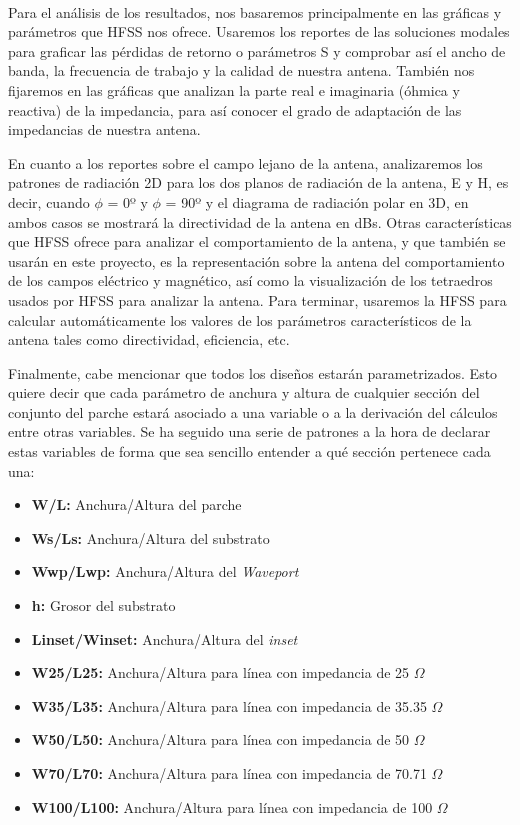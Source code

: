 \\
\par Para el análisis de los resultados, nos basaremos principalmente en las gráficas y parámetros que HFSS nos ofrece. Usaremos los reportes de las soluciones modales para graficar las pérdidas de retorno o parámetros S y comprobar así el ancho de banda, la frecuencia de trabajo y la calidad de nuestra antena. También nos fijaremos en las gráficas que analizan la parte real e imaginaria (óhmica y reactiva) de la impedancia, para así conocer el grado de adaptación de las impedancias de nuestra antena. 
\\
\par En cuanto a los reportes sobre el campo lejano de la antena, analizaremos los patrones de radiación 2D para los dos planos de radiación de la antena, E y H, es decir, cuando $\phi $ = 0º y $\phi $ = 90º y el diagrama de radiación polar en 3D, en ambos casos se mostrará la directividad de la antena en dBs. Otras características que HFSS ofrece para analizar el comportamiento de la antena, y que también se usarán en este proyecto, es la representación sobre la antena del comportamiento de los campos eléctrico y magnético, así como la visualización de los tetraedros usados por HFSS para analizar la antena. Para terminar, usaremos la HFSS para calcular automáticamente los valores de los parámetros característicos de la antena tales como directividad, eficiencia, etc.
\\
\par Finalmente, cabe mencionar que todos los diseños estarán parametrizados. Esto quiere decir que cada parámetro de anchura y altura de cualquier sección del conjunto del parche estará asociado a una variable o a la derivación del cálculos entre otras variables. Se ha seguido una serie de patrones a la hora de declarar estas variables de forma que sea sencillo entender a qué sección pertenece cada una:

\begin{itemize}
\item \textbf{W/L: }Anchura/Altura del parche
\item \textbf{Ws/Ls: }Anchura/Altura del substrato
\item \textbf{Wwp/Lwp: }Anchura/Altura del \textit{Waveport}
\item \textbf{h: }Grosor del substrato
\item \textbf{Linset/Winset: }Anchura/Altura del \textit{inset}
\item \textbf{W25/L25: }Anchura/Altura para línea con impedancia de 25 $\Omega$
\item \textbf{W35/L35: }Anchura/Altura para línea con impedancia de 35.35 $\Omega$
\item \textbf{W50/L50: }Anchura/Altura para línea con impedancia de 50 $\Omega$
\item \textbf{W70/L70: }Anchura/Altura para línea con impedancia de 70.71 $\Omega$
\item \textbf{W100/L100: }Anchura/Altura para línea con impedancia de 100 $\Omega$
\end{itemize}

